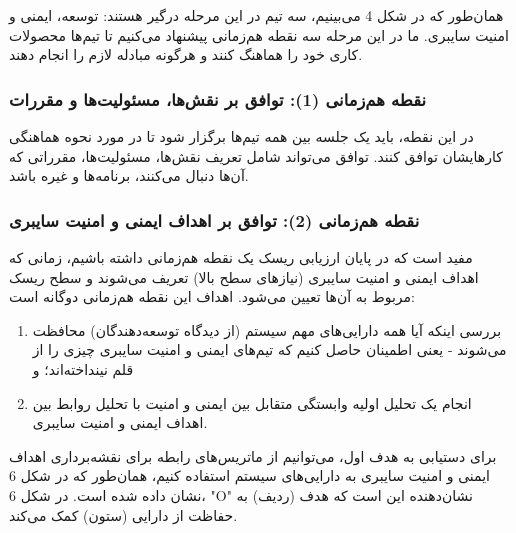 \documentclass[a4paper,10pt]{article}
\begin{document}
            همان‌طور که در شکل 4 می‌بینیم، سه تیم در این مرحله درگیر هستند: توسعه، ایمنی و امنیت سایبری. ما در این مرحله سه نقطه هم‌زمانی پیشنهاد می‌کنیم تا تیم‌ها محصولات کاری خود را هماهنگ کنند و هرگونه مبادله لازم را انجام دهند.

            \subsubsection{نقطه هم‌زمانی (1): توافق بر نقش‌ها، مسئولیت‌ها و مقررات}

                در این نقطه، باید یک جلسه بین همه تیم‌ها برگزار شود تا در مورد نحوه هماهنگی کارهایشان توافق کنند. توافق می‌تواند شامل تعریف نقش‌ها، مسئولیت‌ها، مقرراتی که آن‌ها دنبال می‌کنند، برنامه‌ها و غیره باشد.

            \subsubsection{نقطه هم‌زمانی (2): توافق بر اهداف ایمنی و امنیت سایبری}

                مفید است که در پایان ارزیابی ریسک یک نقطه هم‌زمانی داشته باشیم، زمانی که اهداف ایمنی و امنیت سایبری (نیازهای سطح بالا) تعریف می‌شوند و سطح ریسک مربوط به آن‌ها تعیین می‌شود. اهداف این نقطه هم‌زمانی دوگانه است:

                \begin{enumerate}
                    
                    \item بررسی اینکه آیا همه دارایی‌های مهم سیستم (از دیدگاه توسعه‌دهندگان) محافظت می‌شوند - یعنی اطمینان حاصل کنیم که تیم‌های ایمنی و امنیت سایبری چیزی را از قلم نینداخته‌اند؛ و

                    \item انجام یک تحلیل اولیه وابستگی متقابل بین ایمنی و امنیت با تحلیل روابط بین اهداف ایمنی و امنیت سایبری.
                    
                \end{enumerate}

                برای دستیابی به هدف اول، می‌توانیم از ماتریس‌های رابطه برای نقشه‌برداری اهداف ایمنی و امنیت سایبری به دارایی‌های سیستم استفاده کنیم، همان‌طور که در شکل 6 نشان داده شده است. در شکل 6، "O" نشان‌دهنده این است که هدف (ردیف) به حفاظت از دارایی (ستون) کمک می‌کند.
\end{document}
